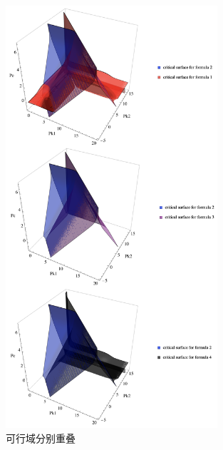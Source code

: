 \documentclass[UTF-8]{ctexart}
\newcommand{\0}{\boldsymbol{0}}
\begin{document}
\begin{figure}
    \centering
    \includegraphics[width=0.7\textwidth]{重叠.png}
    \caption{\kaishu 可行域分别重叠}
    \label{fig:12}
\end{figure}
\end{document}
